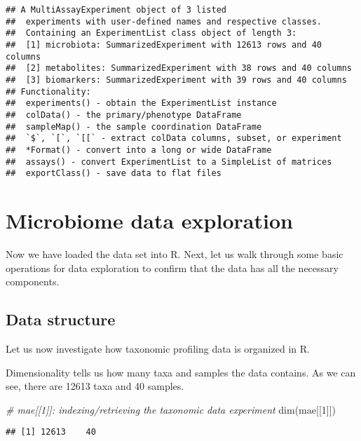 \documentclass[
  oneside]{book}
\newenvironment{Shaded}{\begin{snugshade}}{\end{snugshade}}
\newcommand{\CommentTok}[1]{\textcolor[rgb]{0.56,0.35,0.01}{\textit{#1}}}
\newcommand{\DecValTok}[1]{\textcolor[rgb]{0.00,0.00,0.81}{#1}}
\newcommand{\FunctionTok}[1]{\textcolor[rgb]{0.00,0.00,0.00}{#1}}
\newcommand{\NormalTok}[1]{#1}
\begin{document}
\begin{verbatim}
## A MultiAssayExperiment object of 3 listed
##  experiments with user-defined names and respective classes.
##  Containing an ExperimentList class object of length 3:
##  [1] microbiota: SummarizedExperiment with 12613 rows and 40 columns
##  [2] metabolites: SummarizedExperiment with 38 rows and 40 columns
##  [3] biomarkers: SummarizedExperiment with 39 rows and 40 columns
## Functionality:
##  experiments() - obtain the ExperimentList instance
##  colData() - the primary/phenotype DataFrame
##  sampleMap() - the sample coordination DataFrame
##  `$`, `[`, `[[` - extract colData columns, subset, or experiment
##  *Format() - convert into a long or wide DataFrame
##  assays() - convert ExperimentList to a SimpleList of matrices
##  exportClass() - save data to flat files
\end{verbatim}

\hypertarget{microbiome-data-exploration}{%
\chapter{Microbiome data exploration}\label{microbiome-data-exploration}}

Now we have loaded the data set into R. Next, let us walk through some
basic operations for data exploration to confirm that the data has all
the necessary components.

\hypertarget{data-structure-1}{%
\section{Data structure}\label{data-structure-1}}

Let us now investigate how taxonomic profiling data is organized in R.

Dimensionality tells us how many taxa and samples the data
contains. As we can see, there are 12613 taxa and 40
samples.

\begin{Shaded}
\begin{Highlighting}[]
\CommentTok{\# mae[[1]]: indexing/retrieving the taxonomic data experiment}
\FunctionTok{dim}\NormalTok{(mae[[}\DecValTok{1}\NormalTok{]])}
\end{Highlighting}
\end{Shaded}

\begin{verbatim}
## [1] 12613    40
\end{verbatim}
\end{document}
